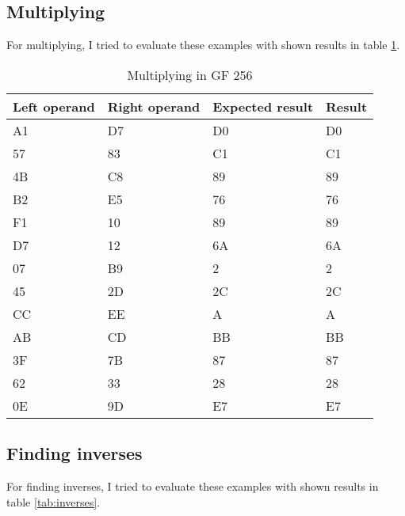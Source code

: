 \documentclass[5pt]{article}
\begin{document}
\newpage
\subsection{Multiplying}
For multiplying, I tried to evaluate these examples with shown results in
table \ref{tab:multiplying}.

\begin{table}[ht]
  \centering
  \caption{Multiplying in GF 256}
  \begin{tabular}{|l|l|l|l|}
  \hline
  Left operand & Right operand & Expected result & Result\\
  \hline
  \hline
  
  A1 & D7 & D0 & D0 \\
  \hline
57 & 83 & C1 & C1\\
\hline
4B & C8 & 89 & 89\\
\hline
B2 & E5 & 76 & 76 \\
\hline
F1 & 10 &  89 & 89\\
\hline 	
D7 & 12 & 6A & 6A \\
\hline 	
07& B9 & 2 &	2\\
\hline 	
45& 2D & 2C &	2C\\
\hline 	
CC& EE & A &	A\\
\hline
AB & CD & BB & BB \\
\hline 	
3F& 7B & 87 &	87\\
\hline 	
62& 33 & 28 &	28\\
\hline 	
0E& 9D & E7 &	E7\\
\hline


  \end{tabular}
  \label{tab:multiplying}
\end{table}



\subsection{Finding inverses}
For finding inverses, I tried to evaluate these examples with shown results in
table \ref{tab:inverses}.
\end{document}

